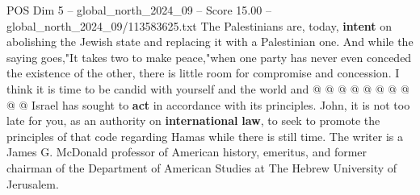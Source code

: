 \begin{textsample}{POS Dim 5 – global\_north\_2024\_09 – Score 15.00 – global\_north\_2024\_09/113583625.txt}
The Palestinians are, today, \textbf{intent} on abolishing the Jewish state and replacing it with a Palestinian one.
And while the saying goes,"It takes two to make peace,"when one party has never even conceded the existence of the other, there is little room for compromise and concession.
I think it is time to be candid with yourself and the world and @ @ @ @ @ @ @ @ @ @ Israel has sought to \textbf{act} in accordance with its principles.
John, it is not too late for you, as an authority on \textbf{international} \textbf{law}, to seek to promote the principles of that code regarding Hamas while there is still time.
The writer is a James G.
McDonald professor of American history, emeritus, and former chairman of the Department of American Studies at The Hebrew University of Jerusalem.

\end{textsample}
